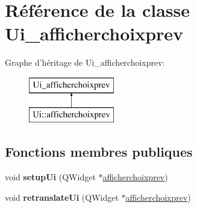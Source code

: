 \hypertarget{class_ui__afficherchoixprev}{\section{Référence de la classe Ui\+\_\+afficherchoixprev}
\label{class_ui__afficherchoixprev}
}
Graphe d'héritage de Ui\+\_\+afficherchoixprev\+:\begin{figure}[H]
\begin{center}
\leavevmode
\includegraphics[height=2.000000cm]{class_ui__afficherchoixprev}
\end{center}
\end{figure}
\subsection*{Fonctions membres publiques}
\begin{DoxyCompactItemize}
\item 
\hypertarget{class_ui__afficherchoixprev_a4ce57f375bb3ce390d6a30b3dfb1df5b}{void {\bfseries setup\+Ui} (Q\+Widget $\ast$\hyperlink{classafficherchoixprev}{afficherchoixprev})}\label{class_ui__afficherchoixprev_a4ce57f375bb3ce390d6a30b3dfb1df5b}

\item 
\hypertarget{class_ui__afficherchoixprev_a78435987c98b93201a36d9dbe65b8f7c}{void {\bfseries retranslate\+Ui} (Q\+Widget $\ast$\hyperlink{classafficherchoixprev}{afficherchoixprev})}\label{class_ui__afficherchoixprev_a78435987c98b93201a36d9dbe65b8f7c}

\end{DoxyCompactItemize}
